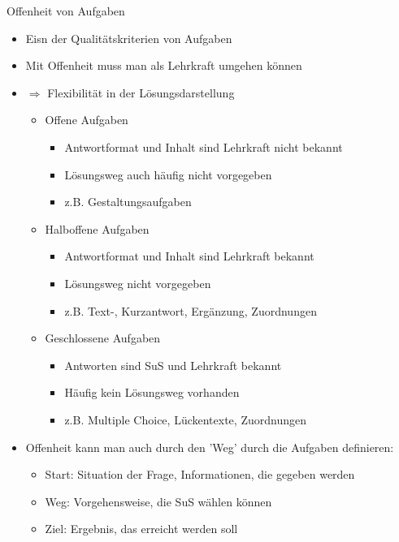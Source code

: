 \documentclass{article}
\begin{document}
\begin{block}{Offenheit von Aufgaben}
    \begin{itemize}
        \item Eisn der Qualitätskriterien von Aufgaben
        \item Mit Offenheit muss man als Lehrkraft umgehen können
        \item $\Rightarrow$ Flexibilität in der Lösungsdarstellung
        \begin{itemize}
            \item Offene Aufgaben
            \begin{itemize}
                \item Antwortformat und Inhalt sind Lehrkraft nicht bekannt
                \item Lösungsweg auch häufig nicht vorgegeben
                \item z.B. Gestaltungsaufgaben
            \end{itemize}
            \item Halboffene Aufgaben
            \begin{itemize}
                \item Antwortformat und Inhalt sind Lehrkraft bekannt
                \item Lösungsweg nicht vorgegeben
                \item z.B. Text-, Kurzantwort, Ergänzung, Zuordnungen
            \end{itemize}
            \item Geschlossene Aufgaben
            \begin{itemize}
                \item Antworten sind SuS und Lehrkraft bekannt
                \item Häufig kein Lösungsweg vorhanden
                \item z.B. Multiple Choice, Lückentexte, Zuordnungen
            \end{itemize}
        \end{itemize}
        \item Offenheit kann man auch durch den 'Weg' durch die Aufgaben definieren:
        \begin{itemize}
            \item Start: Situation der Frage, Informationen, die gegeben werden
            \item Weg: Vorgehensweise, die SuS wählen können
            \item Ziel: Ergebnis, das erreicht werden soll

\end{itemize}
\end{itemize}
\end{block}
\end{document}
